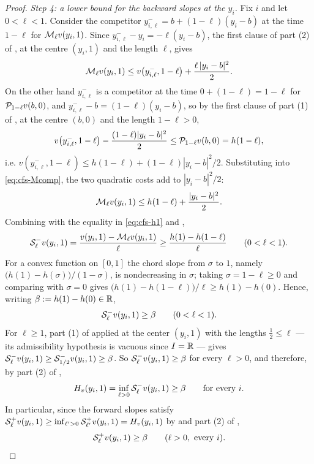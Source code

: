 \begin{proof}
\emph{Step 4: a lower bound for the backward slopes at the $y_i$.}
Fix $i$ and let $0<\ell<1$. Consider the competitor
$y_{i,\ell}^-=b+(1-\ell)(y_i-b)$ at the time $1-\ell$ for $\mathcal{M}_\ell v(y_i,1)$.
Since $y_{i,\ell}^--y_i=-\ell(y_i-b)$, the first clause of part (2) of
, at the centre $(y_i,1)$ and the length
$\ell$, gives
\begin{equation}\label{eq:cfs-Mcomp}
  \mathcal{M}_\ell v(y_i,1)\le v\bigl(y_{i,\ell}^-,1-\ell\bigr)
     +\frac{\ell\,|y_i-b|^2}{2}.
\end{equation}
On the other hand $y_{i,\ell}^-$ is a competitor at the time
$0+(1-\ell)=1-\ell$ for $\mathcal{P}_{1-\ell}v(b,0)$, and
$y_{i,\ell}^--b=(1-\ell)(y_i-b)$, so by the first clause of part (1) of
, at the centre $(b,0)$ and the length
$1-\ell>0$,
\[
  v\bigl(y_{i,\ell}^-,1-\ell\bigr)-\frac{(1-\ell)|y_i-b|^2}{2}
   \le\mathcal{P}_{1-\ell}v(b,0)=h(1-\ell),
\]
i.e. $v(y_{i,\ell}^-,1-\ell)\le h(1-\ell)+(1-\ell)|y_i-b|^2/2$. Substituting
into \eqref{eq:cfs-Mcomp}, the two quadratic costs add to $|y_i-b|^2/2$:
\[
  \mathcal{M}_\ell v(y_i,1)\le h(1-\ell)+\frac{|y_i-b|^2}{2}.
\]
Combining with the equality in \eqref{eq:cfs-h1} and ,
\begin{equation}\label{eq:cfs-slopeM}
  \mathcal{S}_\ell^-v(y_i,1)=\frac{v(y_i,1)-\mathcal{M}_\ell v(y_i,1)}{\ell}
   \ge\frac{h(1)-h(1-\ell)}{\ell}\qquad(0<\ell<1).
\end{equation}
For a convex function on $[0,1]$ the chord slope from $\sigma$ to $1$,
namely $\bigl(h(1)-h(\sigma)\bigr)/(1-\sigma)$, is nondecreasing in $\sigma$;
taking $\sigma=1-\ell\ge0$ and comparing with $\sigma=0$ gives
$\bigl(h(1)-h(1-\ell)\bigr)/\ell\ge h(1)-h(0)$. Hence, writing
$\beta:=h(1)-h(0)\in\mathbb{R}$,
\begin{equation}\label{eq:cfs-beta}
  \mathcal{S}_\ell^-v(y_i,1)\ge\beta\qquad(0<\ell<1).
\end{equation}
For $\ell\ge1$, part (1) of  applied at the
center $(y_i,1)$ with the lengths $\tfrac12\le\ell$ — its admissibility
hypothesis is vacuous since $I=\mathbb{R}$ — gives
$\mathcal{S}_\ell^-v(y_i,1)\ge\mathcal{S}_{1/2}^-v(y_i,1)\ge\beta$. So
$\mathcal{S}_\ell^-v(y_i,1)\ge\beta$ for every $\ell>0$, and therefore, by part (2) of
,
\begin{equation}\label{eq:cfs-Hyi}
  H_v(y_i,1)=\inf_{\ell>0}\mathcal{S}_\ell^-v(y_i,1)\ge\beta
  \qquad\text{for every }i .
\end{equation}
In particular, since the forward slopes satisfy
$\mathcal{S}_\ell^+v(y_i,1)\ge\inf_{\ell'>0}\mathcal{S}_{\ell'}^+v(y_i,1)=H_v(y_i,1)$ by
 and part (2) of ,
\begin{equation}\label{eq:cfs-fwdyi}
  \mathcal{S}_\ell^+v(y_i,1)\ge\beta\qquad(\ell>0,\ \text{every }i).
\end{equation}


\end{proof}
